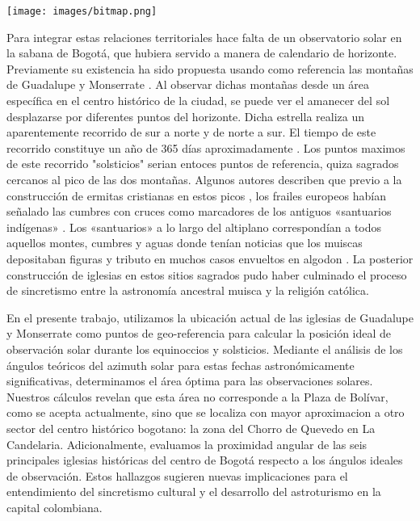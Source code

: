 \documentclass[a4paper,alpha-refs]{eSpectra}
\begin{document}
\smallskip
\centering
   \texttt{[image: images/bitmap.png]}
\justifying

\smallskip

Para integrar estas relaciones territoriales hace falta de un observatorio solar en la sabana de Bogotá, que hubiera servido a manera de calendario de horizonte. Previamente su existencia ha sido propuesta usando como referencia las montañas de Guadalupe y Monserrate \cite{bonilla_observatorio_2011}. Al observar dichas montañas desde un área específica en el centro histórico de la ciudad, se puede ver el amanecer del sol desplazarse por diferentes puntos del horizonte. Dicha estrella realiza un aparentemente recorrido de sur a norte y de norte a sur. El tiempo de este recorrido constituye un año de 365 días aproximadamente \cite{quijano_astronomia_2021}. Los puntos maximos de este recorrido "solsticios" serian entoces puntos de referencia,  quiza sagrados cercanos al pico de las dos montañas.  Algunos autores describen que previo a la construcción de ermitas cristianas en estos picos , los frailes europeos habían señalado las cumbres con cruces como marcadores de los antiguos «santuarios indígenas» \cite{rodriguez_freyle_carnero_1997}. Los «santuarios» a lo largo del altiplano correspondían a todos aquellos montes, cumbres y  aguas donde tenían noticias que los muiscas depositaban figuras y tributo en muchos casos envueltos en algodon  \cite{simon_noticias_historiales_1626}. La posterior construcción de iglesias en estos sitios sagrados pudo haber culminado el proceso de sincretismo entre la astronomía ancestral muisca y la religión católica.

\smallskip
En el presente trabajo,  utilizamos la ubicación actual de las iglesias de Guadalupe y Monserrate como puntos de geo-referencia para calcular la posición ideal de observación solar durante los equinoccios y solsticios. Mediante el análisis de los ángulos teóricos del azimuth solar para estas fechas astronómicamente significativas, determinamos el área óptima para las observaciones solares. Nuestros cálculos revelan que esta área no corresponde a la Plaza de Bolívar, como se acepta actualmente, sino que se localiza con mayor aproximacion a otro sector del centro histórico bogotano: la zona del Chorro de Quevedo en La Candelaria. Adicionalmente, evaluamos la proximidad angular de las seis principales iglesias históricas del centro de Bogotá respecto a los ángulos ideales de observación. Estos hallazgos sugieren nuevas implicaciones para el entendimiento del sincretismo cultural y el desarrollo del astroturismo en la capital colombiana.
\end{document}
